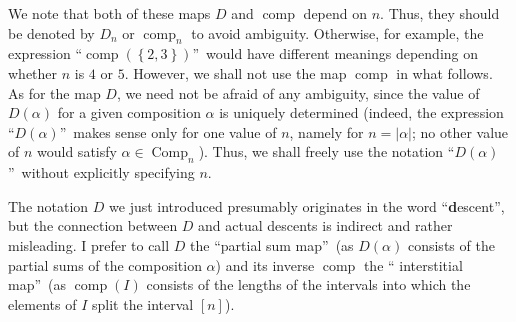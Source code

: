 \documentclass[numbers=enddot,12pt,final,onecolumn,notitlepage]{scrartcl}%
\theoremstyle{definition}
\begin{document}
We note that both of these maps $D$ and
$\operatorname*{comp}$ depend on $n$. Thus, they should be denoted by $D_{n}$
or $\operatorname*{comp}\nolimits_{n}$ to avoid ambiguity. Otherwise, for
example, the expression \textquotedblleft$\operatorname*{comp}\left(  \left\{
2,3\right\}  \right)  $\textquotedblright\ would have different meanings
depending on whether $n$ is $4$ or $5$. However, we shall not use the map
$\operatorname*{comp}$ in what follows. As for the map $D$, we need not be
afraid of any ambiguity, since the value of $D\left(  \alpha\right)  $ for a
given composition $\alpha$ is uniquely determined (indeed, the expression
\textquotedblleft$D\left(  \alpha\right)  $\textquotedblright\ makes sense
only for one value of $n$, namely for $n=\left\vert \alpha\right\vert $; no
other value of $n$ would satisfy $\alpha\in\operatorname*{Comp}\nolimits_{n}%
$). Thus, we shall freely use the notation \textquotedblleft$D\left(
\alpha\right)  $\textquotedblright\ without explicitly specifying $n$.

The notation $D$ we just introduced presumably originates in the word
\textquotedblleft\textbf{d}escent\textquotedblright, but the connection
between $D$ and actual descents is indirect and rather misleading. I prefer to
call $D$ the \textquotedblleft partial sum map\textquotedblright\ (as
$D\left(  \alpha\right)  $ consists of the partial sums of the composition
$\alpha$) and its inverse $\operatorname*{comp}$ the \textquotedblleft
interstitial map\textquotedblright\ (as $\operatorname*{comp}\left(  I\right)
$ consists of the lengths of the intervals into which the elements of $I$
split the interval $\left[  n\right]  $).
\end{document}
